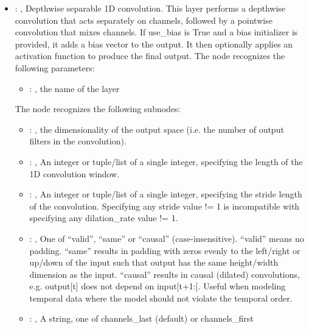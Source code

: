 \begin{itemize}
    \item {}: , 
      Depthwise separable 1D convolution. This layer performs a depthwise convolution that
      acts separately on channels, followed by a pointwise convolution that mixes channels. If
      use\_bias         is True and a bias initializer is provided, it adds a bias vector to the
      output. It then optionally         applies an activation function to produce the final output.
      The  node recognizes the following parameters:
        \begin{itemize}
          \item {}: , 
            the name of the layer
      \end{itemize}

      The  node recognizes the following subnodes:
      \begin{itemize}
        \item {}: , 
          the dimensionality of the output space (i.e. the number of output filters in the
          convolution).

        \item {}: , 
          An integer or tuple/list of a single integer, specifying the length of the 1D convolution
          window.

        \item {}: , 
          An integer or tuple/list of a single integer, specifying the stride length of the
          convolution.         Specifying any stride value != 1 is incompatible with specifying any
          dilation\_rate value != 1.

        \item {}: , 
          One of ``valid'', ``same'' or ``causal'' (case-insensitive). ``valid'' means no padding.
          ``same'' results in padding with zeros evenly to the left/right or up/down of the input
          such that         output has the same height/width dimension as the input. ``causal''
          results in causal (dilated) convolutions,         e.g. output[t] does not depend on
          input[t+1:]. Useful when modeling temporal data where the model should         not violate
          the temporal order.

        \item {}: , 
          A string, one of channels\_last (default) or channels\_first


\end{itemize}
\end{itemize}

